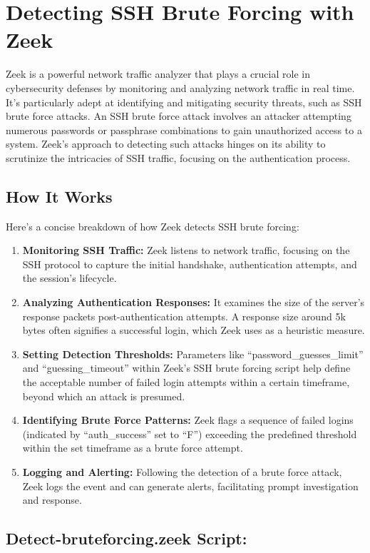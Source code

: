 \section{Detecting SSH Brute Forcing with Zeek}
Zeek is a powerful network traffic analyzer that plays a crucial role in cybersecurity defenses by monitoring and analyzing network traffic in real time. It's particularly adept at identifying and mitigating security threats, such as SSH brute force attacks. An SSH brute force attack involves an attacker attempting numerous passwords or passphrase combinations to gain unauthorized access to a system. Zeek's approach to detecting such attacks hinges on its ability to scrutinize the intricacies of SSH traffic, focusing on the authentication process.

\subsection{How It Works}
Here's a concise breakdown of how Zeek detects SSH brute forcing:

\begin{enumerate}
    \item \textbf{Monitoring SSH Traffic:} Zeek listens to network traffic, focusing on the SSH protocol to capture the initial handshake, authentication attempts, and the session's lifecycle.
    \item \textbf{Analyzing Authentication Responses:} It examines the size of the server's response packets post-authentication attempts. A response size around 5k bytes often signifies a successful login, which Zeek uses as a heuristic measure.
    \item \textbf{Setting Detection Thresholds:} Parameters like ``password\_guesses\_limit'' and ``guessing\_timeout'' within Zeek's SSH brute forcing script help define the acceptable number of failed login attempts within a certain timeframe, beyond which an attack is presumed.
    \item \textbf{Identifying Brute Force Patterns:} Zeek flags a sequence of failed logins (indicated by ``auth\_success'' set to ``F'') exceeding the predefined threshold within the set timeframe as a brute force attempt.
    \item \textbf{Logging and Alerting:} Following the detection of a brute force attack, Zeek logs the event and can generate alerts, facilitating prompt investigation and response.
\end{enumerate}

\subsection{Detect-bruteforcing.zeek Script:}



